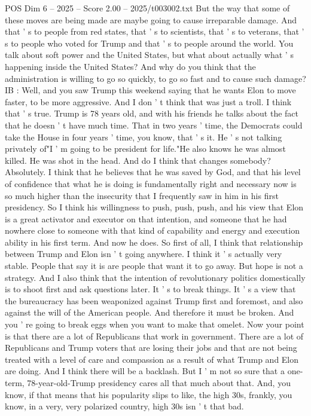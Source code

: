\begin{textsample}{POS Dim 6 – 2025 – Score 2.00 – 2025/t003002.txt}
But the way that some of these moves are being made are maybe going to cause irreparable damage.
And that ' s to people from red states, that ' s to scientists, that ' s to veterans, that ' s to people who voted for Trump and that ' s to people around the world.
You talk about soft power and the United States, but what about actually what ' s happening inside the United States?
And why do you think that the administration is willing to go so quickly, to go so fast and to cause such damage?
IB : Well, and you saw Trump this weekend saying that he wants Elon to move faster, to be more aggressive.
And I don ' t think that was just a troll.
I think that ' s true.
Trump is 78 years old, and with his friends he talks about the fact that he doesn ' t have much time.
That in two years ' time, the Democrats could take the House in four years ' time, you know, that ' s it.
He ' s not talking privately of"I ' m going to be president for life."He also knows he was almost killed.
He was shot in the head.
And do I think that changes somebody?
Absolutely.
I think that he believes that he was saved by God, and that his level of confidence that what he is doing is fundamentally right and necessary now is so much higher than the insecurity that I frequently saw in him in his first presidency.
So I think his willingness to push, push, push, and his view that Elon is a great activator and executor on that intention, and someone that he had nowhere close to someone with that kind of capability and energy and execution ability in his first term.
And now he does.
So first of all, I think that relationship between Trump and Elon isn ' t going anywhere.
I think it ' s actually very stable.
People that say it is are people that want it to go away.
But hope is not a strategy.
And I also think that the intention of revolutionary politics domestically is to shoot first and ask questions later.
It ' s to break things.
It ' s a view that the bureaucracy has been weaponized against Trump first and foremost, and also against the will of the American people.
And therefore it must be broken.
And you ' re going to break eggs when you want to make that omelet.
Now your point is that there are a lot of Republicans that work in government.
There are a lot of Republicans and Trump voters that are losing their jobs and that are not being treated with a level of care and compassion as a result of what Trump and Elon are doing.
And I think there will be a backlash.
But I ' m not so sure that a one-term, 78-year-old-Trump presidency cares all that much about that.
And, you know, if that means that his popularity slips to like, the high 30s, frankly, you know, in a very, very polarized country, high 30s isn ' t that bad.

\end{textsample}
